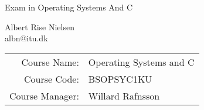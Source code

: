 \begin{titlepage}
  \vspace*{\fill}

  \begin{center}
    {\Huge Exam in Operating Systems And C \par
    }

    \bigskip\bigskip%
    Albert Rise Nielsen\\
    albn@itu.dk


    \bigskip\bigskip\bigskip%
    \begin{tabular}{rl}
      Course Name:& Operating Systems and C\\
      Course Code:& BSOPSYC1KU\\
      Course Manager:& Willard Rafnsson
    \end{tabular}

    \bigskip\bigskip\bigskip\bigskip%
    \date{\today}
  \end{center}

  \vspace*{\fill}
\end{titlepage}